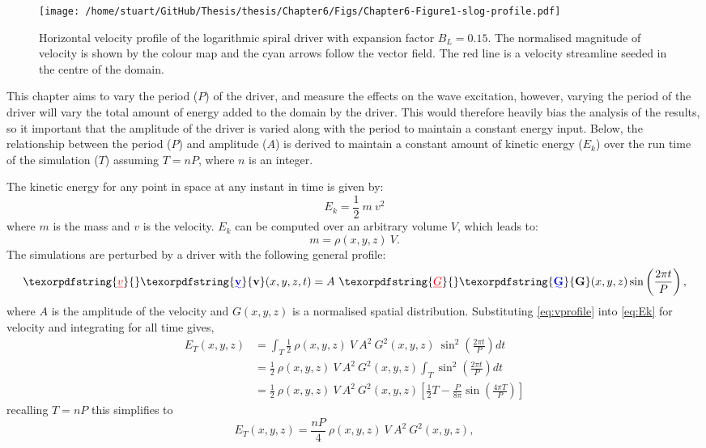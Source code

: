 \documentclass[a4paper,12pt,fourier,authoryear,custommargin]{Classes/PhDThesisPSnPDF}
\renewcommand{\vec}{\mathbf}
\providecommand{\DIFaddtex}[1]{{\protect\color{blue}\uwave{#1}}} %
\providecommand{\DIFdeltex}[1]{{\protect\color{red}\sout{#1}}}                      %
\providecommand{\DIFaddbegin}{} %
\providecommand{\DIFaddend}{} %
\providecommand{\DIFdelbegin}{} %
\providecommand{\DIFdelend}{} %
\providecommand{\DIFadd}[1]{\texorpdfstring{\DIFaddtex{#1}}{#1}} %
\providecommand{\DIFdel}[1]{\texorpdfstring{\DIFdeltex{#1}}{}} %
\begin{document}
\begin{figure}[h]
    \centering
    \texttt{[image: /home/stuart/GitHub/Thesis/thesis/Chapter6/Figs/Chapter6-Figure1-slog-profile.pdf]}
    \caption{Horizontal velocity profile of the logarithmic spiral driver with expansion factor $B_L = 0.15$. The normalised magnitude of velocity is shown by the colour map and the cyan arrows follow the vector field. The red line is a velocity streamline seeded in the centre of the domain.}
    \label{fig:slog-profile}
\end{figure}

This chapter aims to vary the period ($P$) of the driver, and measure the effects on the wave excitation, however, varying the period of the driver will vary the total amount of energy added to the domain by the driver.
This would therefore heavily bias the analysis of the results, so it important that the amplitude of the driver is varied along with the period to maintain a constant energy input.
Below, the relationship between the period ($P$) and amplitude ($A$) is derived to maintain a constant amount of kinetic energy ($E_k$) over the run time of the simulation ($T$) assuming $T = nP$, where $n$ is an integer.

The kinetic energy for any point in space at any instant in time is given by:
\begin{equation}
    E_k = \frac{1}{2}\ m\ v^2\label{eq:Ek}
\end{equation}
where $m$ is the mass and $v$ is the velocity.
$E_k$ can be computed over an arbitrary volume $V$, which leads to:
\begin{equation}
    m = \rho(x,y,z)\ V.\label{eq:mass}
\end{equation}
The simulations are perturbed by a driver with the following general profile:
\begin{equation}
    \DIFdelbegin \DIFdel{v}\DIFdelend \DIFaddbegin \DIFadd{\vec{v}}\DIFaddend (x,y,z,t) = A\ \DIFdelbegin \DIFdel{G}\DIFdelend \DIFaddbegin \DIFadd{\vec{G}}\DIFaddend (x,y,z) \sin \left( \frac{2\pi t}{P} \right),\label{eq:vprofile}
  \end{equation}
where $A$ is the amplitude of the velocity and \DIFdelbegin \DIFdel{$G(x,y,z)$ }\DIFdelend \DIFaddbegin \DIFadd{$\vec{G}(x,y,z)$ }\DIFaddend is a normalised spatial distribution.
Substituting \cref{eq:vprofile} into \cref{eq:Ek} for velocity and integrating for all time gives,
\begin{align}
    E_{T}(x,y,z) &= \int_T \frac{1}{2}\ \rho(x,y,z)\ V\ A^2\ G^2(x,y,z)\ \sin^2\left(\frac{2\pi t}{P} \right) dt \\
    &= \frac{1}{2}\ \rho(x,y,z)\ V\ A^2\ G^2(x,y,z) \int_T \sin^2\left(\frac{2\pi t}{P} \right) dt \\
    & = \frac{1}{2}\ \rho(x,y,z)\ V\ A^2\ G^2(x,y,z) \left[ \frac{1}{2}T - \frac{P}{8\pi} \sin \left(\frac{4\pi T}{P} \right) \right]
\end{align}
recalling $T = nP$ this simplifies to 
\begin{equation}
    E_{T}(x,y,z) = \frac{nP}{4}\ \rho(x,y,z)\ V\ A^2\ G^2(x,y,z), \label{eq:Et_xyz}
\end{equation}
\end{document}
